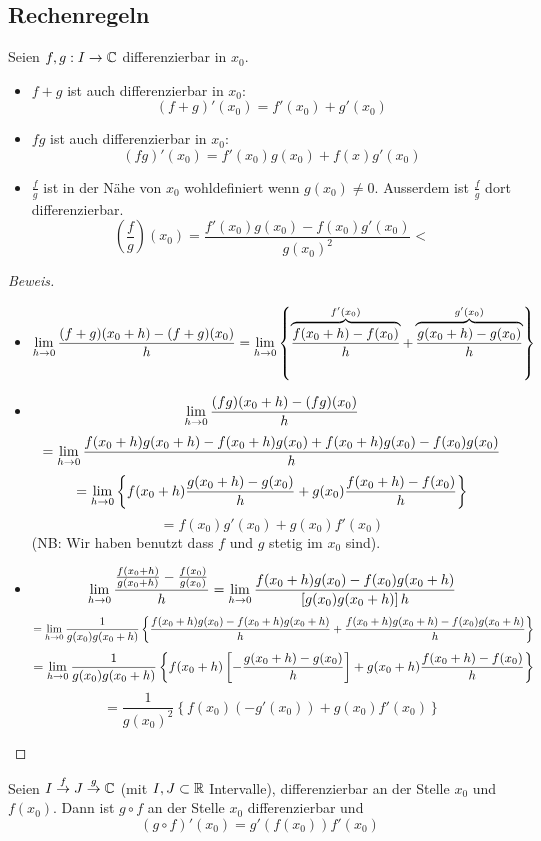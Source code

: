 \subsection{Rechenregeln}
\begin{Sat}
  Seien $f,g:I\to\mathbb{C}$ differenzierbar in $x_0$.
  \begin{itemize}
    \item $f+g$ ist auch differenzierbar in $x_0$: 
      \[(f+g)'(x_0)=f'(x_0)+g'(x_0)\]
    \item $fg$ ist auch differenzierbar in $x_0$: 
      \[(fg)'(x_0)=f'(x_0)g(x_0)+f(x)g'(x_0)\]
    \item $\frac{f}{g}$ ist in der Nähe von $x_0$ wohldefiniert wenn $g(x_0)\neq 0$. Ausserdem ist $\frac{f}{g}$ dort differenzierbar.
      \[\left( \frac{f}{g} \right)(x_0)=\frac{f'(x_0)g(x_0)-f(x_0)g'(x_0)}{g(x_0)^2}<\]
  \end{itemize}
\end{Sat}
\begin{proof}[Beweis]
  \begin{itemize}
    \item
      \[\displaystyle\lim_{h\rightarrow0}\frac{(f+g)(x_0+h)-(f+g)(x_0)}{h}=\displaystyle\lim_{h\rightarrow0}\left\{ \overbrace{\frac{f(x_0+h)-f(x_0)}{h}}^{f'(x_0)}+\overbrace{\frac{g(x_0+h)-g(x_0)}{h}}^{g'(x_0)}\right\}\]
    \item
      \[\displaystyle\lim_{h\rightarrow0}\frac{(fg)(x_0+h)-(fg)(x_0)}{h}\]
      \[=\displaystyle\lim_{h\rightarrow0}\frac{f(x_0+h)g(x_0+h)-f(x_0+h)g(x_0)+f(x_0+h)g(x_0)-f(x_0)g(x_0)}{h}\]
      \[=\displaystyle\lim_{h\rightarrow0}\left\{ f(x_0+h)\frac{g(x_0+h)-g(x_0)}{h}+g(x_0)\frac{f(x_0+h)-f(x_0)}{h} \right\}\]
      \[=f(x_0)g'(x_0)+g(x_0)f'(x_0)\]
(NB: Wir haben benutzt dass $f$ und $g$ stetig im $x_0$ sind).
    \item
      \[\displaystyle\lim_{h\rightarrow0}\frac{\frac{f(x_0+h)}{g(x_0+h)}-\frac{f(x_0)}{g(x_0)}}{h}=\displaystyle\lim_{h\rightarrow0}\frac{f(x_0+h)g(x_0)-f(x_0)g(x_0+h)}{\left[ g(x_0)g(x_0+h) \right] h}\]
      \[=\displaystyle\lim_{h\rightarrow0}\frac{1}{g(x_0)g(x_0+h)}\left\{ \frac{f(x_0+h)g(x_0)-f (x_0+h) g(x_0+h)}{h}+\frac{f(x_0+h)g(x_0+h)-f(x_0)g(x_0+h)}{h} \right\}\]
      \[=\displaystyle\lim_{h\rightarrow0}\frac{1}{g(x_0)g(x_0+h)}\left\{ f(x_0+h)\left[ -\frac{g(x_0+h)-g(x_0)}{h}\right] +g(x_0+h)\frac{f(x_0+h)-f(x_0)}{h} \right\}\]
 \[ = \frac{1}{g(x_0)^2}\left\{ f (x_0) (-g'(x_0)) + g(x_0) f' (x_0)\right\}\] 
\end{itemize}
\end{proof}
\begin{Sat}[Kettenregel]\label{s:Ketten}
  Seien $I\stackrel{f}{\to}J\stackrel{g}{\to}\mathbb{C}$ (mit $I, J\subset\mathbb{R}$ Intervalle), 
differenzierbar an der Stelle $x_0$ und $f(x_0)$. Dann ist $g\circ f$ an der Stelle $x_0$ 
differenzierbar und
  \[(g\circ f)'(x_0)=g'(f(x_0))f'(x_0)\]
\end{Sat}
